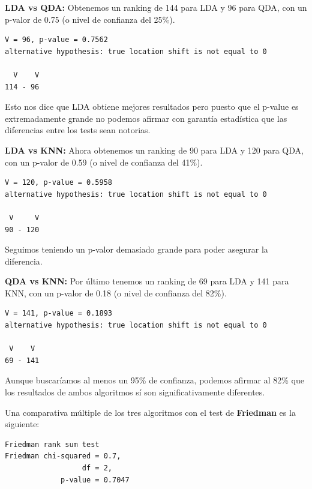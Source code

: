 \textbf{LDA vs QDA:} Obtenemos un ranking de 144 para LDA y 96 para QDA, con un p-valor de 0.75 (o nivel de confianza del 25\%).
\begin{verbatim}
V = 96, p-value = 0.7562
alternative hypothesis: true location shift is not equal to 0

  V    V
114 - 96 
\end{verbatim}

Esto nos dice que LDA obtiene mejores resultados pero puesto que el p-value es extremadamente grande no podemos afirmar con garantía estadística que las diferencias entre los tests sean notorias.

\vspace{\baselineskip}

\textbf{LDA vs KNN:} Ahora obtenemos un ranking de 90 para LDA y 120 para QDA, con un p-valor de 0.59 (o nivel de confianza del 41\%).
\begin{verbatim}
V = 120, p-value = 0.5958
alternative hypothesis: true location shift is not equal to 0

 V     V
90 - 120 
\end{verbatim}

Seguimos teniendo un p-valor demasiado grande para poder asegurar la diferencia.

\vspace{\baselineskip}

\textbf{QDA vs KNN:} Por último tenemos un ranking de 69 para LDA y 141 para KNN, con un p-valor de 0.18 (o nivel de confianza del 82\%).
\begin{verbatim}
V = 141, p-value = 0.1893
alternative hypothesis: true location shift is not equal to 0

 V    V
69 - 141
\end{verbatim}

Aunque buscaríamos al menos un 95\% de confianza, podemos afirmar al 82\% que los resultados de ambos algoritmos sí son significativamente diferentes.

\vspace{\baselineskip}
\vspace{\baselineskip}

Una comparativa múltiple de los tres algoritmos con el test de \textbf{Friedman} es la siguiente:

\begin{verbatim}
Friedman rank sum test
Friedman chi-squared = 0.7, 
                  df = 2, 
             p-value = 0.7047
\end{verbatim}


